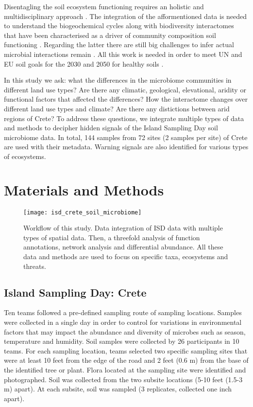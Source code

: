 Disentagling the soil ecosystem functioning requires an holistic and 
multidisciplinary approach \parencite{vogel2022}. The integration of the afformentioned
data is needed to understand the biogeochemical cycles along with biodiversity interactomes 
that have been characterised as a driver of community composition soil
functioning \parencite{GUSEVA2022108604}.
Regarding the latter there are still big challenges to infer actual microbial
interactions remain \parencite{Faust2021}. All this work is needed in order to meet
UN and EU soil goals for the 2030 and 2050 for healthy soils \parencite{LAL2021e00398}.

In this study we ask: what the differences in the microbiome communities in different land use types?
Are there any climatic, geological, elevational, aridity or functional factors that affected the differences?
How the interactome changes over different land use types and climate?
Are there any distictions between arid regions of Crete?
To address these questions, we integrate multiple types of data and methods to decipher hidden 
signals of the Island Sampling Day soil microbiome data. In total, 144 samples from
72 sites (2 samples per site) of Crete are used with their metadata.
Warning signals are also identified for various types of ecosystems.


\section{Materials and Methods}\label{methods}

\begin{figure}[t] 
    \centering\texttt{[image: isd\_crete\_soil\_microbiome]}
    \caption{Workflow of this study. Data integration of ISD data with multiple types of spatial data. Then, a threefold analysis of function annotations, network analysis and differential abundance. All these data and methods are used to focus on specific taxa, ecosystems and threats.}
    \label{fig:workflow}
\end{figure}

\subsection{Island Sampling Day: Crete}\label{isd_data}

Ten teams followed a pre-defined sampling route of sampling locations. Samples
were collected in a single day in order to control for variations in environmental
factors that may impact the abundance and diversity of microbes such as season,
temperature and humidity. Soil samples were collected by 26 participants in 10 teams.
For each sampling location, teams selected two specific sampling sites that were
at least 10 feet from the edge of the road and 2 feet (0.6 m) from the base of
the identified tree or plant. Flora located at the sampling site were
identified and photographed. Soil was collected from the two subsite locations (5-10 feet (1.5-3 m) apart).
At each subsite, soil was sampled (3 replicates, collected one inch apart). 

